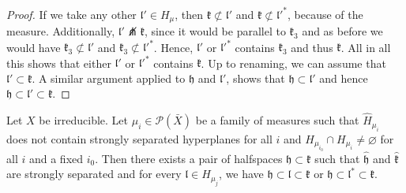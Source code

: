 \begin{proof}
  If we take any other \(\mathfrak{l}' \in H_\mu\), then \(\mathfrak{k} \not\subset \mathfrak{l}'\) and \(\mathfrak{k} \not \subset \mathfrak{l}'^\ast\), because of the measure. Additionally, \(\mathfrak{l}' \not\pitchfork \mathfrak{k}\), since it would be parallel to \(\mathfrak{k}_3\) and as before we would have \(\mathfrak{k}_3 \not\subset \mathfrak{l}'\) and \(\mathfrak{k}_3 \not\subset \mathfrak{l}'^\ast\). Hence, \(\mathfrak{l}'\) or \(\mathfrak{l}'^\ast\) contains \(\mathfrak{k}_3\) and thus \(\mathfrak{k}\). All in all this shows that either \(\mathfrak{l}'\) or \(\mathfrak{l}'^\ast\) contains \(\mathfrak{k}\). Up to renaming, we can assume that \(\mathfrak{l}' \subset \mathfrak{k}\). A similar argument applied to \(\mathfrak{h}\) and \(\mathfrak{l}'\), shows that \(\mathfrak{h} \subset \mathfrak{l}'\) and hence \(\mathfrak{h} \subset \mathfrak{l}' \subset \mathfrak{k}\).
\end{proof}


\begin{lemma}[{\cite[Lemma~4.20]{MR3509968}}]
  \label{lem:4.20}
  Let \(X\) be irreducible. Let \(\mu_i \in \mathcal{P}(\bar X)\) be a family of measures such that \(\hat H_{\mu_i}\) does not contain strongly separated hyperplanes for all \(i\) and \(H_{\mu_{i_0}} \cap H_{\mu_i} \neq \varnothing\) for all \(i\) and a fixed \(i_0\). Then there exists a pair of halfspaces \(\mathfrak{h} \subset \mathfrak{k}\) such that \(\mathfrak{\hat h}\) and \(\mathfrak{\hat k}\) are strongly separated and for every \(\mathfrak{l} \in H_{\mu_j}\), we have \(\mathfrak{h} \subset \mathfrak{l} \subset \mathfrak{k}\) or \(\mathfrak{h} \subset \mathfrak{l}^\ast \subset \mathfrak{k}\).
\end{lemma}


